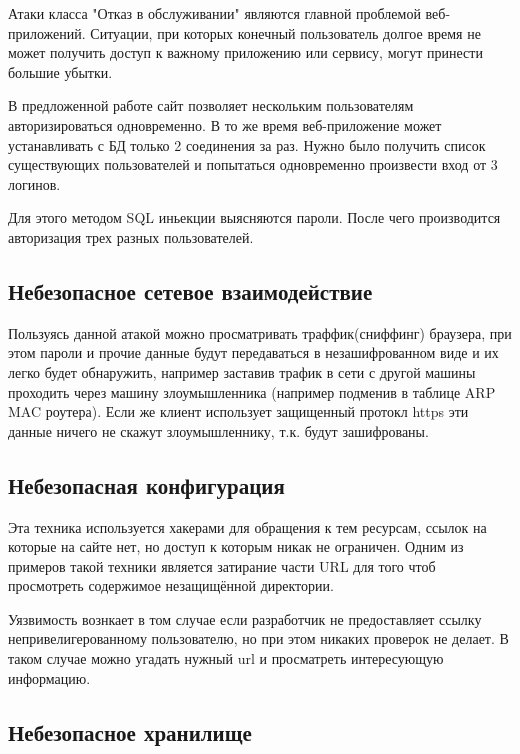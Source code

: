 \documentclass[11pt, a4paper]{article}		%
\begin{document}
Атаки класса "Отказ в обслуживании" являются главной проблемой веб-приложений. Ситуации, при которых конечный пользователь
долгое время не может получить доступ к важному приложению или сервису, могут принести большие убытки.

В предложенной работе сайт позволяет нескольким пользователям авторизироваться одновременно. В то же время
веб-приложение может устанавливать с БД только 2 соединения за раз. Нужно было получить
список существующих пользователей и попытаться одновременно произвести вход от 3 логинов.

Для этого методом SQL иньекции выясняются пароли. После чего производится авторизация трех разных пользователей.



\subsection{Небезопасное сетевое взаимодействие}

Пользуясь данной атакой можно просматривать траффик(сниффинг) браузера, при этом пароли и прочие данные будут передаваться в незашифрованном виде и их легко будет обнаружить, например заставив трафик в сети с другой машины проходить через машину злоумышленника (например подменив в таблице ARP MAC роутера). Если же клиент использует защищенный протокл https эти данные ничего не скажут злоумышленнику, т.к. будут зашифрованы.



\subsection{Небезопасная конфигурация}

Эта техника используется хакерами для обращения к тем ресурсам, ссылок на которые на сайте нет, но доступ к которым никак не ограничен.
Одним из примеров такой техники является затирание части URL для того чтоб просмотреть содержимое незащищённой директории.

Уязвимость вознкает в том случае если разработчик не предоставляет ссылку непривелигерованному пользователю, но при этом никаких проверок не делает. В таком случае можно угадать нужный url и просматреть интересующую информацию.



\subsection{Небезопасное хранилище}
\end{document}
